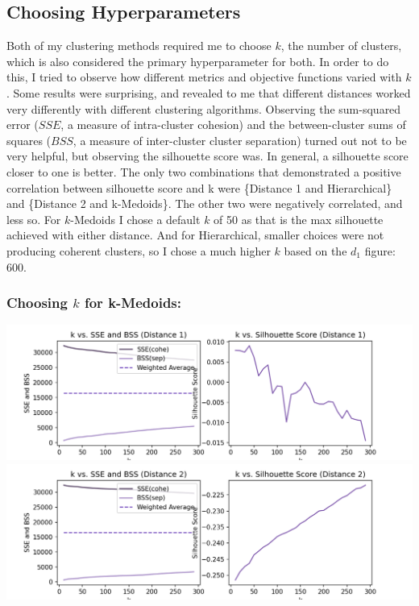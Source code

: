 \documentclass[fleqn]{article}
\begin{document}
\subsection{Choosing Hyperparameters}
Both of my clustering methods required me to choose $k$, the number of clusters, which is also considered the primary hyperparameter for both.  In order to do this, I tried to observe how different metrics and objective functions varied with $k$.  Some results were surprising, and revealed to me that different distances worked very differently with different clustering algorithms.  Observing the sum-squared error ($SSE$, a measure of intra-cluster cohesion) and the between-cluster sums of squares ($BSS$, a measure of inter-cluster cluster separation) turned out not to be very helpful, but observing the silhouette score was.  In general, a silhouette score closer to one is better.  The only two combinations that demonstrated a positive correlation between silhouette score and k were \{Distance 1 and Hierarchical\} and \{Distance 2 and k-Medoids\}. The other two were negatively correlated, and less so.  For $k$-Medoids I chose a default $k$ of 50 as that is the max silhouette achieved with either distance.  And for Hierarchical, smaller choices were not producing coherent clusters, so I chose a much higher $k$ based on the $d_1$ figure: 600.
\subsubsection{Choosing $k$ for k-Medoids:}
\begin{center}
	\includegraphics[scale=0.40]{images/d1_ks.png}
	\includegraphics[scale=0.40]{images/d2_ks.png}
\end{center}
\end{document}
